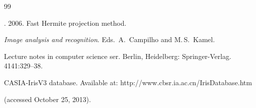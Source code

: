 {{\begin{thebibliography}{99}
 




. 2006. Fast Hermite projection method. 


\textit{Image analysis and recognition}. Eds.\ A.~Campilho and M.\,S.~Kamel.


Lecture notes in computer science ser. Berlin, Heidelberg: Springer-Verlag. 4141:329--38.




CASIA-IrisV3 database. Available at: {\sf http://www.cbsr.ia.ac.cn/IrisDatabase.htm}


(accessed October 25, 2013).


 \end{thebibliography}


} }





\renewcommand{\bibname}{\protect\rmfamily Литература}


